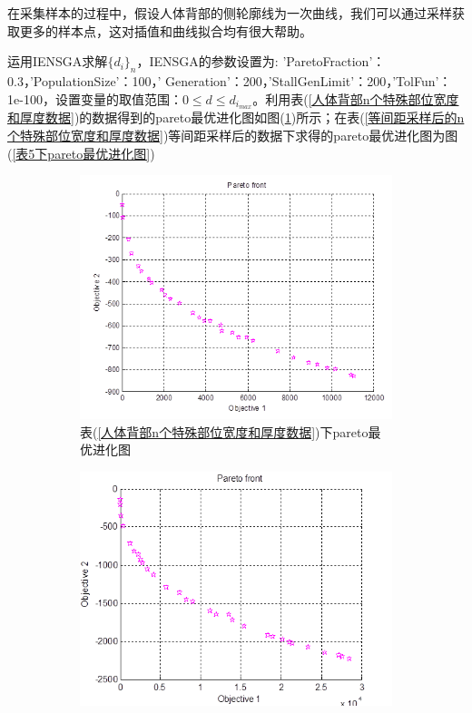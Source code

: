            \par
            在采集样本的过程中，假设人体背部的侧轮廓线为一次曲线，我们可以通过采样获取更多的样本点，这对插值和曲线拟合均有很大帮助。
            \par
            运用IENSGA求解$\{d_i \}_n$，IENSGA的参数设置为: 'ParetoFraction'：0.3，'PopulationSize'：100，' Generation'：200，'StallGenLimit'：200，'TolFun'：1e-100，设置变量的取值范围：$0 \leqslant d \leqslant d_{i_{max}}$。利用表(\ref{人体背部n个特殊部位宽度和厚度数据})的数据得到的pareto最优进化图如图(\ref{表4下pareto最优进化图})所示；在表(\ref{等间距采样后的n个特殊部位宽度和厚度数据})等间距采样后的数据下求得的pareto最优进化图为图(\ref{表5下pareto最优进化图})
                \begin{figure}[H]
                    \centering
                    \begin{subfigure}[b]{0.4\textwidth}
                        \includegraphics[width=\textwidth]{images/tab4_pareto.png}
            \caption{表(\ref{人体背部n个特殊部位宽度和厚度数据})下pareto最优进化图}
            \label{表4下pareto最优进化图}
                    \end{subfigure}
                    \begin{subfigure}[b]{0.4\textwidth}
                        \includegraphics[width=\textwidth]{images/tab5_pareto.png}

\end{subfigure}
\end{figure}
